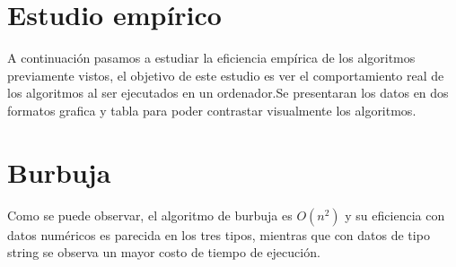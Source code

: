 \documentclass[11pt,openany]{book}
\begin{document}
\section{Estudio empírico}
A continuación pasamos a estudiar la eficiencia empírica de los algoritmos previamente vistos, el objetivo de este estudio es ver el comportamiento real 
de los algoritmos al ser ejecutados en un ordenador.Se presentaran los datos en dos formatos grafica y tabla para poder contrastar visualmente los algoritmos.

\section*{Burbuja}
Como se puede observar, el algoritmo de burbuja es \(O(n^2)\) y su eficiencia con datos numéricos es parecida en los tres
tipos, mientras que con datos de tipo string se observa un mayor costo de tiempo de ejecución.
\end{document}
